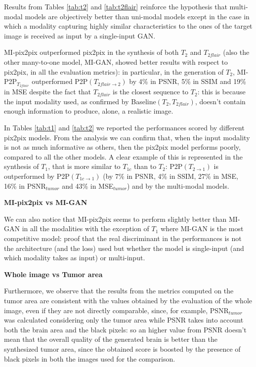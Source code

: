 \vspace{5mm} %
Results from Tables \ref{tab:t2} and \ref{tab:t2flair} reinforce the hypothesis that multi-modal models are objectively better than uni-modal models except in the case in which a modality capturing highly similar characteristics to the ones of the target image is received as input by a single-input \ac{GAN}.


MI-pix2pix outperformed pix2pix in the synthesis of both $T_{2}$ and $T_{2flair}$ (also the other many-to-one model, MI-GAN, showed better results with respect to pix2pix, in all the evaluation metrics): in particular, in the generation of $T_{2}$, MI-P2P{$_{T_{2flair}}$} outperformed  P2P$(T_{2flair \rightarrow 2})$ by 4\% in PSNR, 5\% in SSIM and 19\% in MSE despite the fact that $T_{2flair}$ is the closest sequence to $T_{2}$: this is because the input modality used, as confirmed by Baseline$(T_{2}, T_{2flair})$, doesn't contain enough information to produce, alone, a realistic image.

\vspace{5mm} %
In Tables \ref{tab:t1} and \ref{tab:t2} we reported the performances scored by different pix2pix models. From the analysis we can confirm that, when the input modality is not as much informative as others, then the pix2pix model performs poorly, compared to all the other models.
A clear example of this is represented in the synthesis of $T_{1}$, that is more similar to $T_{1c}$ than to $T_{2}$: P2P$(T_{2 \rightarrow 1})$ is outperformed by P2P$(T_{1c \rightarrow 1})$ (by 7\% in PSNR, 4\% in SSIM, 27\% in MSE, 16\% in PSNR$_{tumor}$ and 43\% in MSE$_{tumor}$) and by the multi-modal models.

\vspace{6mm} 
\noindent\textbf{MI-pix2pix vs MI-GAN}

\vspace{2mm}
\noindent We can also notice that MI-pix2pix seems to perform slightly better than MI-GAN in all the modalities with the exception of $T_{1}$ where MI-GAN is the most competitive model: proof that the real discriminant in the performances is not the architecture (and the loss) used but whether the model is single-input (and which modality takes as input) or multi-input.

\vspace{6mm} 
\noindent\textbf{Whole image vs Tumor area}

\vspace{2mm}
\noindent Furthermore, we observe that the results from the metrics computed on the tumor area are consistent with the values obtained by the evaluation of the whole image, even if they are not directly comparable, since, for example, PSNR$_{tumor}$ was calculated considering only the tumor area while PSNR takes into account both the brain area and the black pixels: so an higher value from PSNR doesn't mean that the overall quality of the generated brain is better than the synthesized tumor area, since the obtained score is boosted by the presence of black pixels in both the images used for the comparison.

